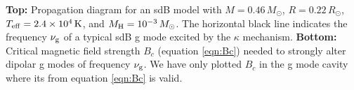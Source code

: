 \label{fig:sdBProp}
{\bf Top:} Propagation diagram for an sdB model with $M=0.46 \, M_\odot$, $R= 0.22 \, R_\odot$, $T_{\rm eff} = 2.4 \times 10^4 \, {\rm K}$, and $M_{\rm H} = 10^{-3} \, M_\odot$. The horizontal black line indicates the frequency $\nu_{\rm g}$ of a typical sdB g mode excited by the $\kappa$ mechanism. {\bf Bottom:} Critical magnetic field strength $B_c$ (equation \ref{eqn:Bc}) needed to strongly alter dipolar g modes of frequency $\nu_{\rm g}$. We have only plotted $B_c$ in the g mode cavity where its from equation \ref{eqn:Bc} is valid.
  
  
  